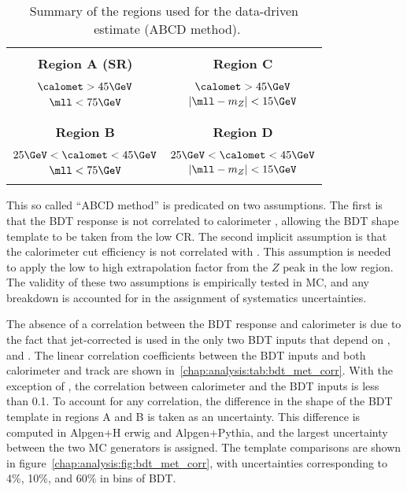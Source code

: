 \begin{table}
\centering
{\footnotesize
    \centering
    \begin{tabular}{|c|c|}
        \hline
        & \\
        \textbf{Region A (SR)}                          &
        \textbf{Region C }                           \\
        & \\
        $\calomet > 45 \GeV$                            & $\calomet >
        45 \GeV$                          \\
        $\mll < 75 \GeV$                                & $|\mll -
        m_Z| < 15 \GeV$              \\
        & \\
        \hline
        & \\
        \textbf{Region B}             & \textbf{Region D} \\
        & \\
        $25 \GeV < \calomet < 45 \GeV$          & $25 \GeV < \calomet
        < 45 \GeV$                        \\
        $\mll < 75 \GeV$                                & $|\mll -
        m_Z| < 15 \GeV$                      \\
        & \\
        \hline
    \end{tabular} }
\caption[Summary of the regions used for the data-driven \ZDY~estimate.]{Summary of the regions used for the data-driven
  \ZDY~estimate (ABCD method).}
\label{chap:analysis:tab:bdt_abcd_cartoon}
\end{table}

This so called ``ABCD method'' is predicated on two assumptions. The
first is that the BDT response is not correlated to calorimeter
\etmiss, allowing the BDT shape template to be taken from the low
\etmiss CR. The second implicit assumption is that the calorimeter
\etmiss cut efficiency is not correlated with \mll. This assumption
is needed to apply the low to high \etmiss extrapolation factor from
the $Z$ peak in the low \mll region. The validity of these two
assumptions is empirically tested in MC, and any breakdown is
accounted for in the assignment of systematics uncertainties. 

The absence of a correlation between the BDT response and calorimeter \etmiss
is due to the fact that jet-corrected \trkmet is used in the only two
BDT inputs that depend on \etmiss, \mT and \pTtot. The linear
correlation coefficients between the BDT inputs and both calorimeter
and track \etmiss are shown
in~\ref{chap:analysis:tab:bdt_met_corr}. With the exception of \mT,
the correlation between calorimeter \etmiss and the BDT inputs is less
than 0.1. To account for any correlation, the difference in the shape
of the BDT template in regions A and B is taken as an
uncertainty. This difference is computed in A{\sc lpgen}+H{\sc
  erwig} and A{\sc lpgen}+P{\sc ythia}, and the largest uncertainty
between the two MC generators is assigned. The template comparisons
are shown in figure~\ref{chap:analysis:fig:bdt_met_corr}, with
uncertainties corresponding to 4\%, 10\%, and 60\% in bins of BDT. 

